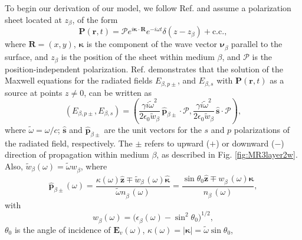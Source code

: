 \documentclass[aps,pra,10pt,amsmath,twocolumn,letterpaper]{revtex4-1}
\begin{document}
To begin our derivation of our model, we follow Ref. \cite{mizrahiJOSA88} and
assume a polarization sheet located at $z_{\beta}$, of the form
\begin{equation}\label{eq:psheet}
\mathbf{P}(\mathbf{r},t) = \boldsymbol{\mathcal{P}}
e^{i\boldsymbol{\kappa}\cdot\mathbf{R}}e^{-i\omega t}\delta(z - z_{\beta}) 
+ \mathrm{c.c.},
\end{equation}
where $\mathbf{R}=(x,y)$, $\boldsymbol{\kappa}$ is the component of the wave
vector $\boldsymbol{\nu}^{\phantom{a}}_{\beta}$ parallel to the surface, and
$z_{\beta}$ is the position of the sheet within medium $\beta$, and
$\boldsymbol{\mathcal{P}}$ is the position-independent polarization. Ref.
\cite{sipeJOSAB87} demonstrates that the solution of the Maxwell equations for
the radiated fields $E_{\beta,p\pm}$, and $E_{\beta,s}$ with
$\mathbf{P}(\mathbf{r},t)$ as a source at points $z\neq 0$, can be written as
\begin{equation}\label{eq:solmaxwell}
(E_{\beta,p\pm},E_{\beta,s}) = 
(\frac{\gamma i\tilde{\omega}^2}{2\epsilon_{0}\tilde{w}_{\beta}}
\,\hat{\mathbf{p}}_{\beta\pm}\cdot\boldsymbol{\mathcal{P}},
\frac{\gamma i\tilde{\omega}^2}{2\epsilon_{0}\tilde{w}_{\beta}}
\,\hat{\mathbf{s}}\cdot\boldsymbol{\mathcal{P}}),
\end{equation} 
where $\tilde{\omega}=\omega/c$; $\hat{\mathbf{s}}$ and
$\hat{\mathbf{p}}_{\beta\pm}$ are the unit vectors for the $s$ and $p$
polarizations of the radiated field, respectively. The $\pm$ refers to upward
($+$) or downward ($-$) direction of propagation within medium $\beta$, as
described in Fig. \ref{fig:MR3layer2w}. Also,
$\tilde{w}^{\phantom{a}}_{\beta}(\omega)=\tilde{\omega}w^{\phantom{a}}_{\beta}$,
where
\begin{equation}\label{eq:r4}
\hat{\mathbf{p}}^{\phantom{A}}_{\beta\pm}(\omega) =
  \frac{\kappa(\omega)\hat{\mathbf{z}}\mp 
  \tilde{w}^{\phantom{A}}_{\beta}(\omega)\hat{\boldsymbol{\kappa}}} 
  {\tilde{\omega} n^{\phantom{A}}_{\beta}(\omega)}
= \frac{\sin\theta_{0}\hat{\mathbf{z}}\mp 
  w^{\phantom{A}}_{\beta}(\omega)\hat{\boldsymbol{\kappa}}} 
  {n^{\phantom{A}}_{\beta}(\omega)},
\end{equation}
with
\begin{equation}\label{eq:wavevector}
w^{\phantom{a}}_{\beta}(\omega) = 
\big(\epsilon^{\phantom{a}}_{\beta}(\omega) - \sin^{2}\theta_{0}\big)^{1/2},
\end{equation}
$\theta_{0}$ is the angle of incidence of $\mathbf{E}_{v}(\omega)$,
$\kappa(\omega)=\vert\boldsymbol{\kappa}\vert = \tilde{\omega}\sin\theta_{0}$,
\end{document}
